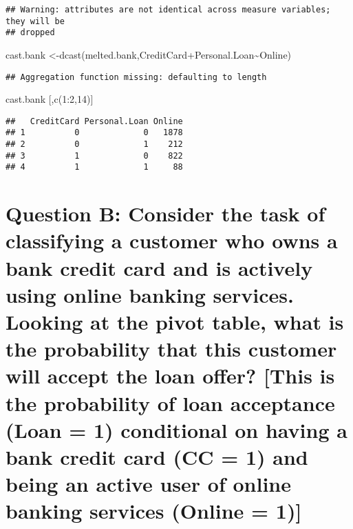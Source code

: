 \documentclass[
]{article}
\newenvironment{Shaded}{\begin{snugshade}}{\end{snugshade}}
\newcommand{\DecValTok}[1]{\textcolor[rgb]{0.00,0.00,0.81}{#1}}
\newcommand{\FunctionTok}[1]{\textcolor[rgb]{0.00,0.00,0.00}{#1}}
\newcommand{\NormalTok}[1]{#1}
\newcommand{\OtherTok}[1]{\textcolor[rgb]{0.56,0.35,0.01}{#1}}
\newcommand{\SpecialCharTok}[1]{\textcolor[rgb]{0.00,0.00,0.00}{#1}}
\begin{document}
\begin{verbatim}
## Warning: attributes are not identical across measure variables; they will be
## dropped
\end{verbatim}

\begin{Shaded}
\begin{Highlighting}[]
\NormalTok{cast.bank }\OtherTok{\textless{}{-}}\FunctionTok{dcast}\NormalTok{(melted.bank,CreditCard}\SpecialCharTok{+}\NormalTok{Personal.Loan}\SpecialCharTok{\textasciitilde{}}\NormalTok{Online)}
\end{Highlighting}
\end{Shaded}

\begin{verbatim}
## Aggregation function missing: defaulting to length
\end{verbatim}

\begin{Shaded}
\begin{Highlighting}[]
\NormalTok{cast.bank [,}\FunctionTok{c}\NormalTok{(}\DecValTok{1}\SpecialCharTok{:}\DecValTok{2}\NormalTok{,}\DecValTok{14}\NormalTok{)]}
\end{Highlighting}
\end{Shaded}

\begin{verbatim}
##   CreditCard Personal.Loan Online
## 1          0             0   1878
## 2          0             1    212
## 3          1             0    822
## 4          1             1     88
\end{verbatim}

\hypertarget{question-b-consider-the-task-of-classifying-a-customer-who-owns-a-bank-credit-card-and-is-actively-using-online-banking-services.-looking-at-the-pivot-table-what-is-the-probability-that-this-customer-will-accept-the-loan-offer-this-is-the-probability-of-loan-acceptance-loan-1-conditional-on-having-a-bank-credit-card-cc-1-and-being-an-active-user-of-online-banking-services-online-1}{%
\section{Question B: Consider the task of classifying a customer who
owns a bank credit card and is actively using online banking services.
Looking at the pivot table, what is the probability that this customer
will accept the loan offer? {[}This is the probability of loan
acceptance (Loan = 1) conditional on having a bank credit card (CC = 1)
and being an active user of online banking services (Online =
1){]}}\label{question-b-consider-the-task-of-classifying-a-customer-who-owns-a-bank-credit-card-and-is-actively-using-online-banking-services.-looking-at-the-pivot-table-what-is-the-probability-that-this-customer-will-accept-the-loan-offer-this-is-the-probability-of-loan-acceptance-loan-1-conditional-on-having-a-bank-credit-card-cc-1-and-being-an-active-user-of-online-banking-services-online-1}}
\end{document}

